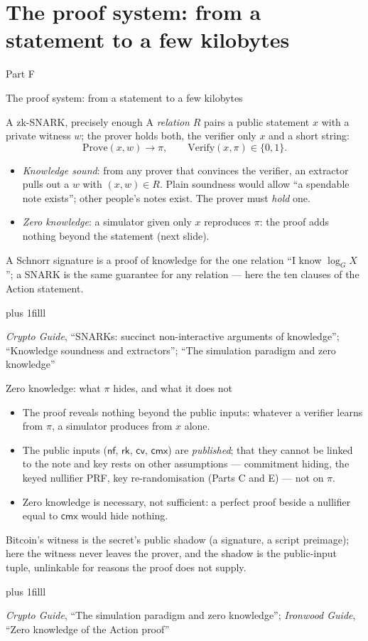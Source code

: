 \documentclass[aspectratio=169,11pt]{beamer}
\newcommand{\nfsym}{\ensuremath{\mathsf{nf}}}
\newcommand{\cmx}{\ensuremath{\mathsf{cmx}}}
\newcommand{\cvsym}{\ensuremath{\mathsf{cv}}}
\newcommand{\rksym}{\ensuremath{\mathsf{rk}}}
\newcommand{\divider}[2]{%
  \section{#2}
  \begin{frame}[plain,t]
  \vspace*{14mm}
  {\small\color{arb}#1\par}
  \vskip8mm
  \begin{minipage}{0.88\textwidth}\raggedright
    \fontsize{27}{31}\selectfont #2\par
  \end{minipage}
  \end{frame}}
\newcommand{\src}[1]{\par\vskip0pt plus 1filll
  {\fontsize{6}{7.2}\selectfont\color{arbdim}\raggedright #1\par}}
\begin{document}
\divider{Part F}{The proof system: from a statement to a few kilobytes}

\begin{frame}{A zk-SNARK, precisely enough}
A \emph{relation} $R$ pairs a public statement $x$ with a private witness
$w$; the prover holds both, the verifier only $x$ and a short string:
\[
\mathrm{Prove}(x, w) \to \pi, \qquad
\mathrm{Verify}(x, \pi) \in \{0, 1\}.
\]
\begin{itemize}
  \item \emph{Knowledge sound}: from any prover that convinces the
    verifier, an extractor pulls out a $w$ with $(x, w) \in R$. Plain
    soundness would allow ``a spendable note exists''; other people's
    notes exist. The prover must \emph{hold} one.
  \item \emph{Zero knowledge}: a simulator given only $x$ reproduces
    $\pi$: the proof adds nothing beyond the statement (next slide).
\end{itemize}
A Schnorr signature is a proof of knowledge for the one relation ``I
know $\log_G X$''; a SNARK is the same guarantee for any relation ---
here the ten clauses of the Action statement.
\src{\emph{Crypto Guide}, ``SNARKs: succinct non-interactive arguments of
knowledge''; ``Knowledge soundness and extractors''; ``The simulation
paradigm and zero knowledge''}
\end{frame}

\begin{frame}{Zero knowledge: what $\pi$ hides, and what it does not}
\begin{itemize}
  \item The proof reveals nothing beyond the public inputs: whatever a
    verifier learns from $\pi$, a simulator produces from $x$ alone.
  \item The public inputs ($\nfsym$, $\rksym$, $\cvsym$, $\cmx$) are
    \emph{published}; that they cannot be linked to the note and key
    rests on other assumptions --- commitment hiding, the keyed
    nullifier PRF, key re-randomisation (Parts C and E) --- not on
    $\pi$.
  \item Zero knowledge is necessary, not sufficient: a perfect proof
    beside a nullifier equal to $\cmx$ would hide nothing.
\end{itemize}
Bitcoin's witness is the secret's public shadow (a signature, a script
preimage); here the witness never leaves the prover, and the shadow is
the public-input tuple, unlinkable for reasons the proof does not supply.
\src{\emph{Crypto Guide}, ``The simulation paradigm and zero
knowledge''; \emph{Ironwood Guide}, ``Zero knowledge of the Action proof''}
\end{frame}
\end{document}
